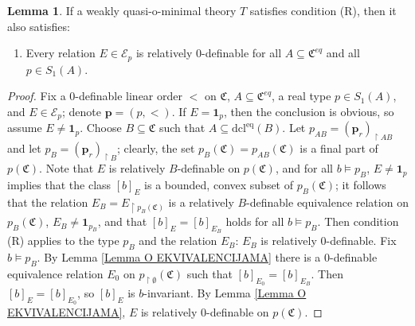 \documentclass{amsart}
\theoremstyle{definition}
\newtheorem{Lemma}[Theorem]{Lemma}
\theoremstyle{definition}
\def\strok{\restriction}
\newcommand{\Mon}{\mathfrak C}
\newcommand{\Moneq}{\mathfrak C^{eq}}
\newcommand{\dcleq}{\mathrm{dcl^{eq}}}
\begin{document}
 
\begin{Lemma}\label{Lema_R_on_eq}
 If a weakly quasi-o-minimal theory $T$ satisfies condition (R), then it also satisfies:
\begin{enumerate}
\item[\hspace{10pt} (R)$^\mathrm{eq}$] Every relation $E\in \mathcal E_p$ is relatively $0$-definable for all $A\subseteq \Moneq$ and all $p\in S_1(A)$.
\end{enumerate}
\end{Lemma}
\begin{proof} 
Fix a 0-definable linear order $<$ on $\Mon$, $A\subseteq\Moneq$, a real type $p\in S_1(A)$, and $E\in\mathcal E_p$; denote $\mathbf p=(p,<)$.
If $E=\mathbf 1_p$, then the conclusion is obvious, so assume $E\neq\mathbf 1_p$. 
Choose $B\subseteq \Mon$ such that $A\subseteq \dcleq(B)$. Let $p_{AB}=(\mathbf p_r)_{\strok AB}$ and let $p_B=(\mathbf p_r)_{\strok B}$; clearly, the set $p_B(\Mon)=p_{AB}(\Mon)$ is a final part of $p(\Mon)$. Note that $E$ is relatively $B$-definable on $p(\Mon)$, and for all $b\models p_B$, $E\neq\mathbf 1_p$ implies that the class $[b]_E$ is a bounded, convex subset of $p_B(\Mon)$; it follows that the relation $E_B=E_{\strok p_B(\Mon)}$ is a relatively $B$-definable equivalence relation on $p_B(\Mon)$, $E_B\neq \mathbf 1_{p_B}$, and that $[b]_E=[b]_{E_B}$ holds for all $b\models p_B$. Then condition (R) applies to the type $p_B$ and the relation $E_B$: $E_B$ is relatively $0$-definable. 
Fix $b\models p_B$.
By Lemma \ref{Lemma O EKVIVALENCIJAMA} there is a $0$-definable equivalence relation $E_0$ on $p_{\strok \emptyset}(\Mon)$ such that $[b]_{E_0}=[b]_{E_B}$. Then $[b]_E=[b]_{E_0}$, so $[b]_E$ is $b$-invariant. By Lemma \ref{Lemma O EKVIVALENCIJAMA}, $E$ is relatively $0$-definable on $p(\Mon)$. 
\end{proof}

 
 
\end{document}
